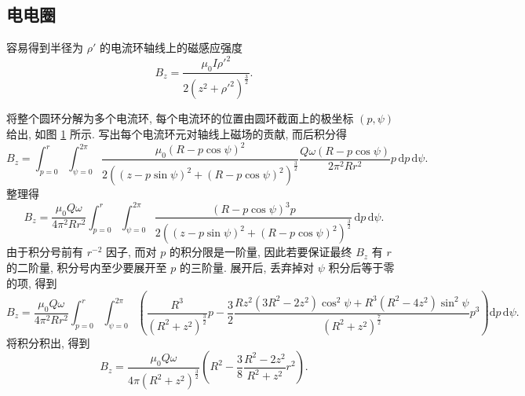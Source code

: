 \documentclass{article}
\begin{document}
\subsection{电电圈}

容易得到半径为 $\rho'$ 的电流环轴线上的磁感应强度
\begin{equation}
	B_z=\frac{\mu_0I\rho'^2}{2\left(z^2+\rho'^2\right)^\frac32}.
\end{equation}
\begin{figure}[h!]
	\centering
	\caption{}
	\label{fig:电流环元}
\end{figure}
将整个圆环分解为多个电流环, 每个电流环的位置由圆环截面上的极坐标 $\left(p,\psi\right)$ 给出, 如图 \ref{fig:电流环元} 所示.
写出每个电流环元对轴线上磁场的贡献, 而后积分得
\begin{equation}
	B_z=\int_{p=0}^r\int_{\psi=0}^{2\pi}\frac{\mu_0\left(R-p\cos\psi\right)^2}{2\left(\left(z-p\sin\psi\right)^2+\left(R-p\cos\psi\right)^2\right)^\frac32}
	\frac{Q\omega\left(R-p\cos\psi\right)}{2\pi^2Rr^2}
	p\,\mathrm dp\,\mathrm d\psi.
\end{equation}
整理得
\begin{equation}
	B_z=\frac{\mu_0Q\omega}{4\pi^2Rr^2}
	\int_{p=0}^r\int_{\psi=0}^{2\pi}
	\frac{\left(R-p\cos\psi\right)^3p}{2\left(\left(z-p\sin\psi\right)^2+\left(R-p\cos\psi\right)^2\right)^\frac32}
	\,\mathrm dp\,\mathrm d\psi.
\end{equation}
由于积分号前有 $r^{-2}$ 因子, 而对 $p$ 的积分限是一阶量,
因此若要保证最终 $B_z$ 有 $r$ 的二阶量, 积分号内至少要展开至 $p$ 的三阶量.
展开后, 丢弃掉对 $\psi$ 积分后等于零的项, 得到
\begin{equation}
	B_z=\frac{\mu_0Q\omega}{4\pi^2Rr^2}
	\int_{p=0}^r\int_{\psi=0}^{2\pi}
	\left(\frac{R^3}{\left(R^2+z^2\right)^{\frac32}}p-
	\frac32\frac{Rz^2\left(3R^2-2z^2\right)\cos^2\psi+R^3\left(R^2-4z^2\right)\sin^2\psi}{\left(R^2+z^2\right)^\frac72}p^3\right)
	\mathrm dp\,\mathrm d\psi.
\end{equation}
将积分积出, 得到
\begin{equation}
	B_z=\frac{\mu_0Q\omega}{4\pi\left(R^2+z^2\right)^{\frac32}}
	\left(R^2-
	\frac{3}{8}\frac{R^2-2z^2}{R^2+z^2}r^2\right).
\end{equation}
\end{document}
